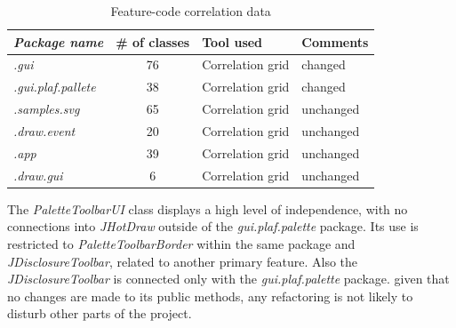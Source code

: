 \begin{table}[H]
    \centering
    \begin{tabular}{|l|c|l|p{5cm}|}
        \hline
        \textbf{\textit{Package name}} & \textbf{\# of classes} & \textbf{Tool used} & \textbf{Comments} \\ \hline
        \textit{.gui}                  & 76                     & Correlation grid   & changed           \\ \hline
        \textit{.gui.plaf.pallete}     & 38                     & Correlation grid   & changed           \\ \hline
        \textit{.samples.svg}          & 65                     & Correlation grid   & unchanged         \\ \hline
        \textit{.draw.event}           & 20                     & Correlation grid   & unchanged         \\ \hline
        \textit{.app}                  & 39                     & Correlation grid   & unchanged         \\ \hline
        \textit{.draw.gui}             & 6                      & Correlation grid   & unchanged         \\ \hline
    \end{tabular}
    \caption{Feature-code correlation data}
    \label{table:feature_code_correlation}
\end{table}

The \textit{PaletteToolbarUI} class displays a high level of independence, with no connections into \textit{JHotDraw} outside of the
\textit{gui.plaf.palette} package. Its use is restricted to \textit{PaletteToolbarBorder} within the same package and \textit{JDisclosureToolbar},
related to another primary feature. Also the \textit{JDisclosureToolbar} is connected only with the \textit{gui.plaf.palette} package.
given that no changes are made to its public methods, any refactoring is not likely to disturb other parts of the project.
